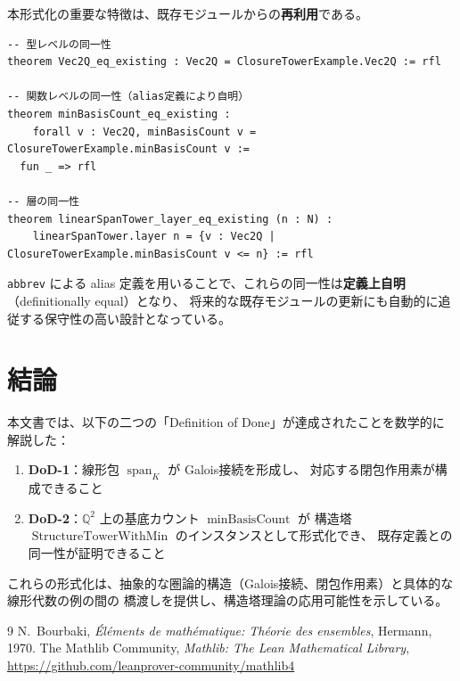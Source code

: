 \documentclass[a4paper,11pt]{ltjsarticle}
\theoremstyle{definition}
\begin{document}
本形式化の重要な特徴は、既存モジュールからの\textbf{再利用}である。

\begin{leancode}
\begin{lstlisting}
-- 型レベルの同一性
theorem Vec2Q_eq_existing : Vec2Q = ClosureTowerExample.Vec2Q := rfl

-- 関数レベルの同一性（alias定義により自明）
theorem minBasisCount_eq_existing :
    forall v : Vec2Q, minBasisCount v = ClosureTowerExample.minBasisCount v :=
  fun _ => rfl

-- 層の同一性
theorem linearSpanTower_layer_eq_existing (n : N) :
    linearSpanTower.layer n = {v : Vec2Q | ClosureTowerExample.minBasisCount v <= n} := rfl
\end{lstlisting}
\end{leancode}

\texttt{abbrev} による alias 定義を用いることで、これらの同一性は\textbf{定義上自明}（definitionally equal）となり、
将来的な既存モジュールの更新にも自動的に追従する保守性の高い設計となっている。

\section{結論}

本文書では、以下の二つの「Definition of Done」が達成されたことを数学的に解説した：

\begin{enumerate}
  \item \textbf{DoD-1}：線形包 $\operatorname{span}_K$ が Galois接続を形成し、
        対応する閉包作用素が構成できること
  \item \textbf{DoD-2}：$\mathbb{Q}^2$ 上の基底カウント $\operatorname{minBasisCount}$ が
        構造塔 $\operatorname{StructureTowerWithMin}$ のインスタンスとして形式化でき、
        既存定義との同一性が証明できること
\end{enumerate}

これらの形式化は、抽象的な圏論的構造（Galois接続、閉包作用素）と具体的な線形代数の例の間の
橋渡しを提供し、構造塔理論の応用可能性を示している。

\begin{thebibliography}{9}
   N.~Bourbaki, \textit{Éléments de mathématique: Théorie des ensembles}, Hermann, 1970.
   The Mathlib Community, \textit{Mathlib: The Lean Mathematical Library}, 
    \url{https://github.com/leanprover-community/mathlib4}
\end{thebibliography}
\end{document}
